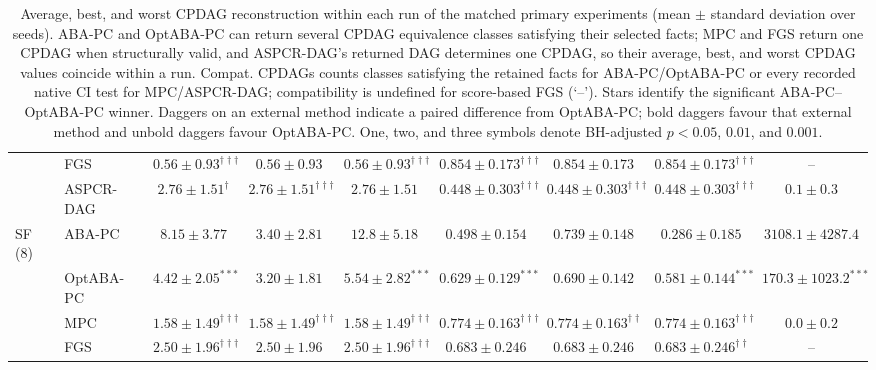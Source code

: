 \begin{table}[t]
{\begin{tabular}{llccccccc}
 & FGS & $\mathbf{0.56\pm0.93}^{\dagger\dagger\dagger}$ & $0.56\pm0.93$ & $\mathbf{0.56\pm0.93}^{\dagger\dagger\dagger}$ & $\mathbf{0.854\pm0.173}^{\dagger\dagger\dagger}$ & $0.854\pm0.173$ & $\mathbf{0.854\pm0.173}^{\dagger\dagger\dagger}$ & --\\
 & ASPCR-DAG & $2.76\pm1.51^{\dagger}$ & $2.76\pm1.51^{\dagger\dagger\dagger}$ & $2.76\pm1.51$ & $0.448\pm0.303^{\dagger\dagger\dagger}$ & $0.448\pm0.303^{\dagger\dagger\dagger}$ & $0.448\pm0.303^{\dagger\dagger\dagger}$ & $0.1\pm0.3$\\
\midrule
SF (8) & ABA-PC & $8.15\pm3.77$ & $3.40\pm2.81$ & $12.8\pm5.18$ & $0.498\pm0.154$ & $0.739\pm0.148$ & $0.286\pm0.185$ & $3108.1\pm4287.4$\\
 & OptABA-PC & $\mathbf{4.42\pm2.05}^{***}$ & $3.20\pm1.81$ & $\mathbf{5.54\pm2.82}^{***}$ & $\mathbf{0.629\pm0.129}^{***}$ & $0.690\pm0.142$ & $\mathbf{0.581\pm0.144}^{***}$ & $\mathbf{170.3\pm1023.2}^{***}$\\
 & MPC & $\mathbf{1.58\pm1.49}^{\dagger\dagger\dagger}$ & $\mathbf{1.58\pm1.49}^{\dagger\dagger\dagger}$ & $\mathbf{1.58\pm1.49}^{\dagger\dagger\dagger}$ & $\mathbf{0.774\pm0.163}^{\dagger\dagger\dagger}$ & $\mathbf{0.774\pm0.163}^{\dagger\dagger}$ & $\mathbf{0.774\pm0.163}^{\dagger\dagger\dagger}$ & $0.0\pm0.2$\\
 & FGS & $\mathbf{2.50\pm1.96}^{\dagger\dagger\dagger}$ & $2.50\pm1.96$ & $\mathbf{2.50\pm1.96}^{\dagger\dagger\dagger}$ & $0.683\pm0.246$ & $0.683\pm0.246$ & $\mathbf{0.683\pm0.246}^{\dagger\dagger}$ & --\\
\bottomrule
\end{tabular}
}%
\caption{Average, best, and worst CPDAG reconstruction within each run of the matched primary experiments (mean $\pm$ standard deviation over seeds). ABA-PC and OptABA-PC can return several CPDAG equivalence classes satisfying their selected facts; MPC and FGS return one CPDAG when structurally valid, and ASPCR-DAG's returned DAG determines one CPDAG, so their average, best, and worst CPDAG values coincide within a run. Compat. CPDAGs counts classes satisfying the retained facts for ABA-PC/OptABA-PC or every recorded native CI test for MPC/ASPCR-DAG; compatibility is undefined for score-based FGS (`--'). Stars identify the significant ABA-PC--OptABA-PC winner. Daggers on an external method indicate a paired difference from OptABA-PC; bold daggers favour that external method and unbold daggers favour OptABA-PC. One, two, and three symbols denote BH-adjusted $p<0.05$, $0.01$, and $0.001$.}
\label{tab:final-cpdag-ranges}
\end{table}
